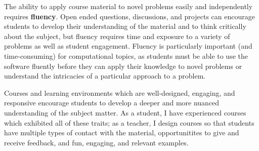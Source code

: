 \documentclass[10pt,letterpaper,sans,unicode]{moderncv}        %
\begin{document}

The ability to apply course material to novel problems easily and independently requires \textbf{fluency}. Open ended questions, discussions, and projects can encourage students to develop their understanding of the material and to think critically about the subject, but fluency requires time and exposure to a variety of problems as well as student engagement. Fluency is particularly important (and time-consuming) for computational topics, as students must be able to use the software fluently before they can apply their knowledge to novel problems or understand the intricacies of a particular approach to a problem. 

\vspace{1cm}\noindent Courses and learning environments which are well-designed, engaging, and responsive encourage students to develop a deeper and more nuanced understanding of the subject matter. As a student, I have experienced courses which exhibited all of these traits; as a teacher, I design courses so that students have multiple types of contact with the material, opportunitites to give and receive feedback, and fun, engaging, and relevant examples. 
\end{document}
